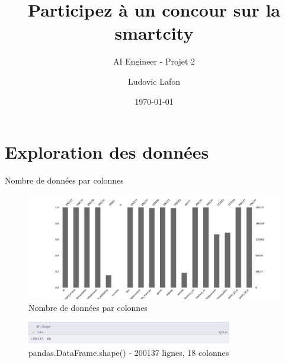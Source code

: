 \documentclass{beamer}
\title{Participez à un concour sur la smartcity}
\subtitle{AI Engineer - Projet 2}
\date{\today}
\author{Ludovic Lafon}
\institute{OpenClassrooms}
\begin{document}
\maketitle
\tableofcontents
\section{Exploration des données}
\begin{frame}{Nombre de données par colonnes}
	\begin{figure}
		\includegraphics[width=\textwidth,height=0.6\textheight,keepaspectratio]{ressources/missingno1.png}
			\caption{Nombre de données par colonnes}
	\end{figure}
	\begin{figure}
		\includegraphics[width=0.80\textwidth,keepaspectratio]{ressources/dfinfo1.png}
			\caption{pandas.DataFrame.shape() - 200137 lignes, 18 colonnes}
	\end{figure}
\end{frame}
\end{document}
